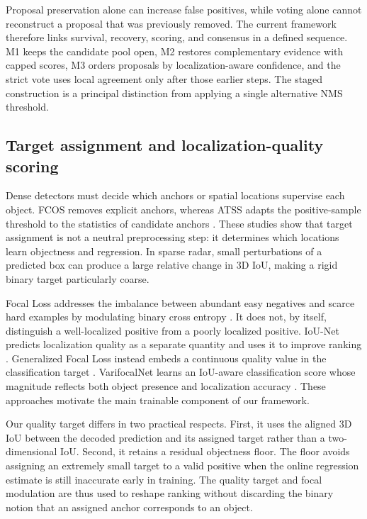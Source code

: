 \documentclass[final,5p,times]{elsarticle}
\begin{document}
Proposal preservation alone can increase false positives, while voting alone
cannot reconstruct a proposal that was previously removed. The current
framework therefore links survival, recovery, scoring, and consensus in a
defined sequence. M1 keeps the candidate pool open, M2 restores complementary
evidence with capped scores, M3 orders proposals by localization-aware
confidence, and the strict vote uses local agreement only after those earlier
steps. The staged construction is a principal distinction from applying a
single alternative NMS threshold.

\subsection{Target assignment and localization-quality scoring}

Dense detectors must decide which anchors or spatial locations supervise each
object. FCOS removes explicit anchors, whereas ATSS adapts the positive-sample
threshold to the statistics of candidate anchors
\cite{tian2019fcos,zhang2020atss}. These studies show that target assignment is
not a neutral preprocessing step: it determines which locations learn
objectness and regression. In sparse radar, small perturbations of a predicted
box can produce a large relative change in 3D IoU, making a rigid binary target
particularly coarse.

Focal Loss addresses the imbalance between abundant easy negatives and scarce
hard examples by modulating binary cross entropy
\cite{lin2017focal}. It does not, by itself, distinguish a well-localized
positive from a poorly localized positive. IoU-Net predicts localization
quality as a separate quantity and uses it to improve ranking
\cite{jiang2018iounet}. Generalized Focal Loss instead embeds a continuous
quality value in the classification target \cite{li2022gfl}. VarifocalNet
learns an IoU-aware classification score whose magnitude reflects both object
presence and localization accuracy \cite{zhang2021varifocalnet}. These
approaches motivate the main trainable component of our framework.

Our quality target differs in two practical respects. First, it uses the
aligned 3D IoU between the decoded prediction and its assigned target rather
than a two-dimensional IoU. Second, it retains a residual objectness floor.
The floor avoids assigning an extremely small target to a valid positive when
the online regression estimate is still inaccurate early in training. The
quality target and focal modulation are thus used to reshape ranking without
discarding the binary notion that an assigned anchor corresponds to an object.
\end{document}
